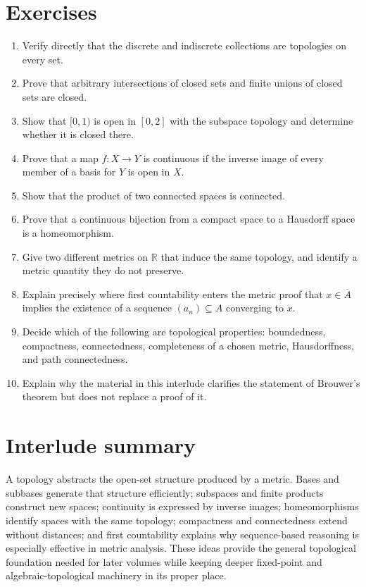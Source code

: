 \section*{Exercises}
\begin{enumerate}
\item Verify directly that the discrete and indiscrete collections are topologies on every set.
\item Prove that arbitrary intersections of closed sets and finite unions of closed sets are closed.
\item Show that \([0,1)\) is open in \([0,2]\) with the subspace topology and determine whether it is closed there.
\item Prove that a map \(f:X\to Y\) is continuous if the inverse image of every member of a basis for \(Y\) is open in \(X\).
\item Show that the product of two connected spaces is connected.
\item Prove that a continuous bijection from a compact space to a Hausdorff space is a homeomorphism.
\item Give two different metrics on \(\mathbb R\) that induce the same topology, and identify a metric quantity they do not preserve.
\item Explain precisely where first countability enters the metric proof that \(x\in\overline A\) implies the existence of a sequence \((a_n)\subseteq A\) converging to \(x\).
\item Decide which of the following are topological properties: boundedness, compactness, connectedness, completeness of a chosen metric, Hausdorffness, and path connectedness.
\item Explain why the material in this interlude clarifies the statement of Brouwer's theorem but does not replace a proof of it.
\end{enumerate}

\section*{Interlude summary}
A topology abstracts the open-set structure produced by a metric. Bases and subbases generate that structure efficiently; subspaces and finite products construct new spaces; continuity is expressed by inverse images; homeomorphisms identify spaces with the same topology; compactness and connectedness extend without distances; and first countability explains why sequence-based reasoning is especially effective in metric analysis. These ideas provide the general topological foundation needed for later volumes while keeping deeper fixed-point and algebraic-topological machinery in its proper place.
